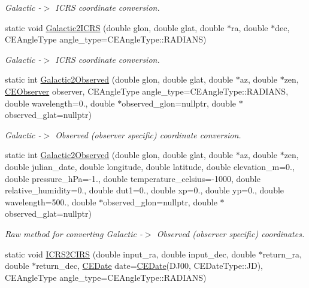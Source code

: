 \begin{DoxyCompactItemize}
\begin{DoxyCompactList}\small\item\em Galactic -\/$>$ I\+C\+R\+S coordinate conversion. \end{DoxyCompactList}\item 
\hypertarget{class_c_e_coordinates_afa288c6036d21ed291dc37d11314443b}{}static void \hyperlink{class_c_e_coordinates_afa288c6036d21ed291dc37d11314443b}{Galactic2\+I\+C\+R\+S} (double glon, double glat, double $\ast$ra, double $\ast$dec, C\+E\+Angle\+Type angle\+\_\+type=C\+E\+Angle\+Type\+::\+R\+A\+D\+I\+A\+N\+S)\label{class_c_e_coordinates_afa288c6036d21ed291dc37d11314443b}

\begin{DoxyCompactList}\small\item\em Galactic -\/$>$ I\+C\+R\+S coordinate conversion. \end{DoxyCompactList}\item 
static int \hyperlink{class_c_e_coordinates_a975c625831eea820a2ebb4b1c7429ca7}{Galactic2\+Observed} (double glon, double glat, double $\ast$az, double $\ast$zen, \hyperlink{class_c_e_observer}{C\+E\+Observer} observer, C\+E\+Angle\+Type angle\+\_\+type=C\+E\+Angle\+Type\+::\+R\+A\+D\+I\+A\+N\+S, double wavelength=0., double $\ast$observed\+\_\+glon=nullptr, double $\ast$observed\+\_\+glat=nullptr)
\begin{DoxyCompactList}\small\item\em Galactic -\/$>$ Observed (observer specific) coordinate conversion. \end{DoxyCompactList}\item 
static int \hyperlink{class_c_e_coordinates_af9ec0c48ebb8b488932626a98338189b}{Galactic2\+Observed} (double glon, double glat, double $\ast$az, double $\ast$zen, double julian\+\_\+date, double longitude, double latitude, double elevation\+\_\+m=0., double pressure\+\_\+h\+Pa=-\/1., double temperature\+\_\+celsius=-\/1000, double relative\+\_\+humidity=0., double dut1=0., double xp=0., double yp=0., double wavelength=500., double $\ast$observed\+\_\+glon=nullptr, double $\ast$observed\+\_\+glat=nullptr)
\begin{DoxyCompactList}\small\item\em Raw method for converting Galactic -\/$>$ Observed (observer specific) coordinates. \end{DoxyCompactList}\item 
static void \hyperlink{class_c_e_coordinates_a696c97fd9243fa7f6a18f746983d7bc4}{I\+C\+R\+S2\+C\+I\+R\+S} (double input\+\_\+ra, double input\+\_\+dec, double $\ast$return\+\_\+ra, double $\ast$return\+\_\+dec, \hyperlink{class_c_e_date}{C\+E\+Date} date=\hyperlink{class_c_e_date}{C\+E\+Date}(D\+J00, C\+E\+Date\+Type\+::\+J\+D), C\+E\+Angle\+Type angle\+\_\+type=C\+E\+Angle\+Type\+::\+R\+A\+D\+I\+A\+N\+S)

\end{DoxyCompactItemize}
